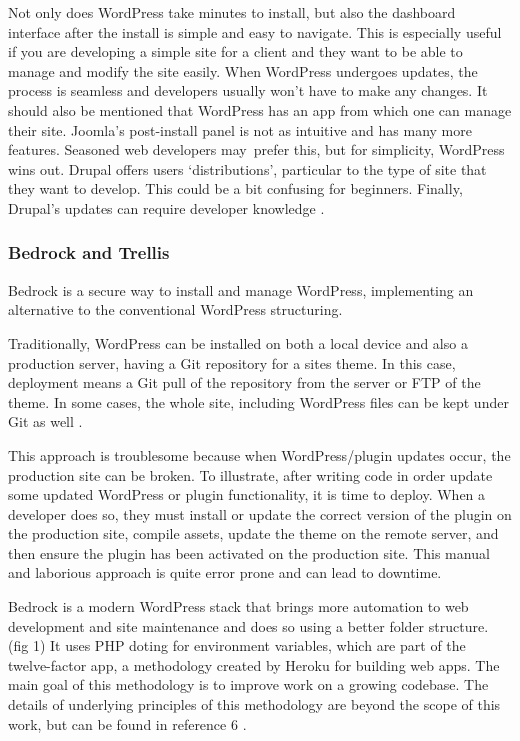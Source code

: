 \documentclass[fontsize=10pt]{extarticle}
\numberwithin{figure}{section} %
\begin{document}
Not only does WordPress take minutes to install, but also the dashboard
interface after the install is simple and easy to navigate. This is
especially useful if you are developing a simple site for a client and
they want to be able to manage and modify the site easily. When
WordPress undergoes updates, the process is seamless and developers
usually won't have to make any changes. It should also be mentioned that
WordPress has an app from which one can manage their site. Joomla's
post-install panel is not as intuitive and has many more features.
Seasoned web developers may~prefer this, but for simplicity, WordPress
wins out. Drupal offers users `distributions', particular to the type of
site that they want to develop. This could be a bit confusing for
beginners. Finally, Drupal's updates can require developer knowledge
\cite{p2} \cite{p3} \cite{p4} .

\hypertarget{bedrock-and-trellis}{%
\subsubsection{Bedrock and Trellis}\label{bedrock-and-trellis}}

Bedrock is a secure way to install and manage WordPress, implementing an
alternative to the conventional WordPress structuring.

Traditionally, WordPress can be installed on both a local device and
also a production server, having a Git repository for a sites theme. In
this case, deployment means a Git pull of the repository from the server
or FTP of the theme. In some cases, the whole site, including WordPress
files can be kept under Git as well \cite{p6} .

This approach is troublesome because when WordPress/plugin updates
occur, the production site can be broken. To illustrate, after writing
code in order update some updated WordPress or plugin functionality, it
is time to deploy. When a developer does so, they must install or update
the correct version of the plugin on the production site, compile
assets, update the theme on the remote server, and then ensure the
plugin has been activated on the production site. This manual and
laborious approach is quite error prone and can lead to downtime.

Bedrock is a modern WordPress stack that brings more automation to web
development and site maintenance and does so using a better folder
structure. (fig 1) It uses PHP doting for environment variables, which
are part of the twelve-factor app, a methodology created by Heroku for
building web apps\cite{p5}. The main goal of this methodology is to
improve work on a growing codebase. The details of underlying principles
of this methodology are beyond the scope of this work, but can be found
in reference 6 \cite{p8} .
\end{document}
